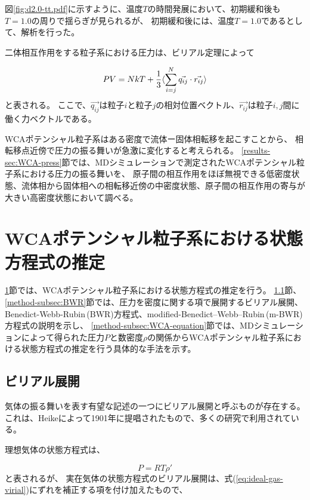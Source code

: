 \documentclass[titlepage]{jsreport}
\begin{document}
{{{図\ref{fig:d2.0-tt.pdf}に示すように、温度$T$の時間発展において、初期緩和後も$T=1.0$の周りで揺らぎが見られるが、
初期緩和後には、温度$T=1.0$であるとして、解析を行った。


\newpage
二体相互作用をする粒子系における圧力は、ビリアル定理によって

\large
\begin{equation}
PV=NkT+{\frac{1}{3}}\langle\sum_{i=j}^N\vec{q_{ij}} \cdot \vec{r_{ij}}\rangle{\label{eq:Theoritical-pressure}}
\end{equation}
\normalsize
と表される\cite{Theoritical-pressure,virial-therom}。
ここで、$\vec{q_{ij}}$は粒子$i$と粒子$j$の相対位置ベクトル、$\vec{r_{ij}}$は粒子$i,j$間に働く力ベクトルである。

WCAポテンシャル粒子系はある密度で流体ー固体相転移を起こすことから、
相転移点近傍で圧力の振る舞いが急激に変化すると考えられる。
\ref{results-sec:WCA-press}節では、MDシミュレーションで測定されたWCAポテンシャル粒子系における圧力の振る舞いを、
原子間の相互作用をほぼ無視できる低密度状態、流体相から固体相への相転移近傍の中密度状態、原子間の相互作用の寄与が大きい高密度状態において調べる。

\section{WCAポテンシャル粒子系における状態方程式の推定}\label{method-sec:WCA-equation}
\ref{method-sec:WCA-equation}節では、WCAポテンシャル粒子系における状態方程式の推定を行う。
\ref{method-subsec:virial}節、\ref{method-subsec:BWR}節では、圧力を密度に関する項で展開するビリアル展開、Benedict-Webb-Rubin\,(BWR)方程式、modified-Benedict–Webb–Rubin\,(m-BWR)方程式の説明を示し、
\ref{method-subsec:WCA-equation}節では、MDシミュレーションによって得られた圧力$P$と数密度$\rho$の関係からWCAポテンシャル粒子系における状態方程式の推定を行う具体的な手法を示す。

\subsection{ビリアル展開}\label{method-subsec:virial}
気体の振る舞いを表す有望な記述の一つにビリアル展開と呼ぶものが存在する。
これは、Heikeによって1901年に提唱されたもの\cite{virial-Heike}で、多くの研究で利用されている\cite{virial-expansion-example1,virial-expansion-example2,virial-expansion-example3}。

理想気体の状態方程式は、

\large
\begin{equation}
P=RT{\rho}' \label{eq:ideal-gas-virial}
\end{equation}
\normalsize
と表されるが、
実在気体の状態方程式のビリアル展開は、式(\ref{eq:ideal-gas-virial})にずれを補正する項を付け加えたもので、

}}}
\end{document}

